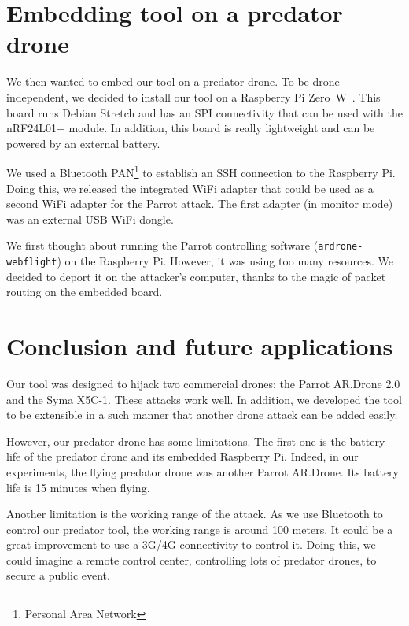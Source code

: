 \documentclass[conference,a4paper]{IEEEtran}
\newcommand{\myv}[1]{\texttt{\small#1}}
\begin{document}
\section{Embedding tool on a predator drone}
We then wanted to embed our tool on a predator drone. To be drone-independent, we decided
to install our tool on a Raspberry Pi Zero~W~\cite{bib:rpi0w}. This board runs Debian
Stretch and has an SPI connectivity that can be used with the nRF24L01+ module. In
addition, this board is really lightweight and can be powered by an external battery.

We used a Bluetooth PAN\footnote{Personal Area Network} to establish an SSH connection to
the Raspberry Pi. Doing this, we released the integrated WiFi adapter that could be used
as a second WiFi adapter for the Parrot attack. The first adapter (in monitor mode) was an
external USB WiFi dongle.

We first thought about running the Parrot controlling software (\myv{ardrone-webflight})
on the Raspberry Pi. However, it was using too many resources. We decided to deport it on
the attacker's computer, thanks to the magic of packet routing on the embedded board.



\section{Conclusion and future applications}
Our tool was designed to hijack two commercial drones: the Parrot AR.Drone 2.0 and the
Syma X5C-1. These attacks work well. In addition, we developed the tool to be extensible
in a such manner that another drone attack can be added easily.

However, our predator-drone has some limitations. The first one is the battery life of the
predator drone and its embedded Raspberry Pi. Indeed, in our experiments, the flying
predator drone was another Parrot AR.Drone. Its battery life is 15 minutes when flying.

Another limitation is the working range of the attack. As we use Bluetooth to control our
predator tool, the working range is around 100 meters. It could be a great improvement to
use a 3G/4G connectivity to control it. Doing this, we could imagine a remote control
center, controlling lots of predator drones, to secure a public event.




\end{document}
